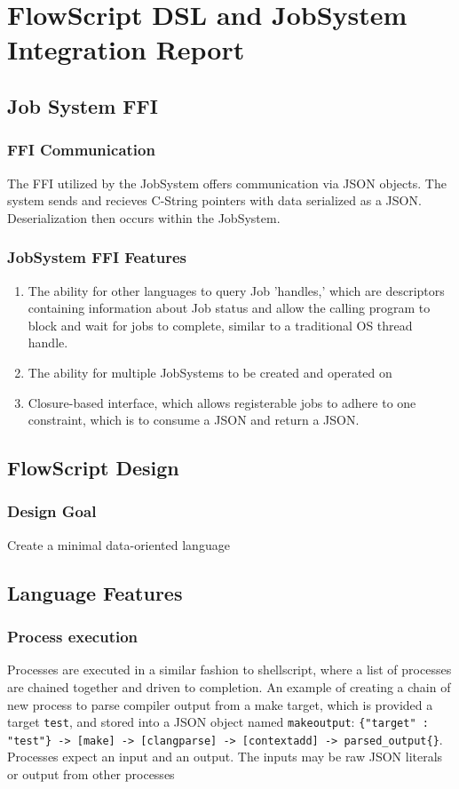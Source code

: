 \documentclass{article}
\begin{document}
\section*{FlowScript DSL and JobSystem Integration Report}
	\subsection{Job System FFI}
		\subsubsection{FFI Communication}
			The FFI utilized by the JobSystem offers communication via JSON objects. The system sends and recieves C-String pointers with data serialized as a JSON. Deserialization then occurs within the JobSystem.
		\subsubsection{JobSystem FFI Features}
			\begin{enumerate}
				\item The ability for other languages to query Job 'handles,' which are descriptors containing information about Job status and allow the calling program to block and wait for jobs to complete, similar to a traditional OS thread handle.
				\item The ability for multiple JobSystems to be created and operated on
				\item Closure-based interface, which allows registerable jobs to adhere to one constraint, which is to consume a JSON and return a JSON.
			\end{enumerate}
	\subsection{FlowScript Design}
		\subsubsection{Design Goal}
			Create a minimal data-oriented language
		\subsection{Language Features}
			\subsubsection{Process execution}
				Processes are executed in a similar fashion to shellscript, where a list of processes are chained together and driven to completion. An example of creating a chain of new process to parse compiler output from a make target, which is provided a target \texttt{test}, and stored into a JSON object named \texttt{makeoutput}: \texttt{\{"target" : "test"\} -> [make] -> [clangparse] -> [contextadd] -> parsed\_output\{\}}. Processes expect an input and an output. The inputs may be raw JSON literals or output from other processes
\end{document}
